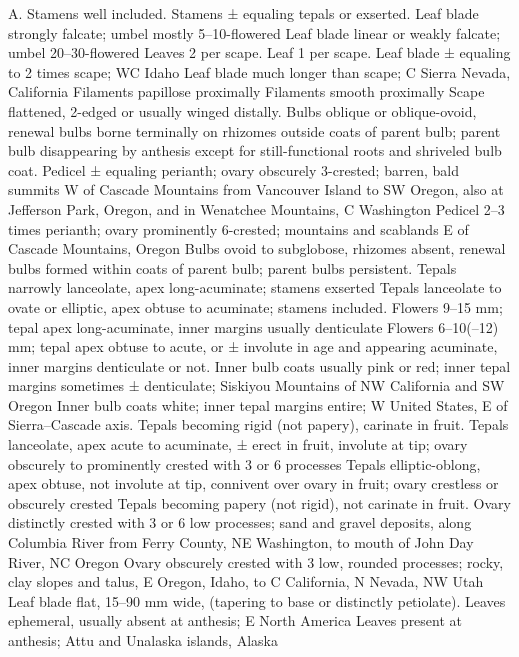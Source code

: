 \documentclass[a4paper]{article}
\begin{document}
\begin{Key}{A. }
\alter Stamens well included.
\alter Stamens ± equaling tepals or exserted.
\alter Leaf blade strongly falcate; umbel mostly 5--10-flowered
\alter Leaf blade linear or weakly falcate; umbel 20--30-flowered
\alter Leaves 2 per scape.
\alter Leaf 1 per scape.
\alter Leaf blade ± equaling to 2 times scape; WC Idaho
\alter Leaf blade much longer than scape; C Sierra Nevada, California
\alter Filaments papillose proximally
\alter Filaments smooth proximally
\alter Scape flattened, 2-edged or usually winged distally.
\alter Bulbs oblique or oblique-ovoid, renewal bulbs borne terminally on rhizomes outside coats of parent bulb; parent bulb disappearing by anthesis except for still-functional roots and shriveled bulb coat.
\alter Pedicel ± equaling perianth; ovary obscurely 3-crested; barren, bald summits W of Cascade Mountains from Vancouver Island to SW Oregon, also at Jefferson Park, Oregon, and in Wenatchee Mountains, C Washington
\alter Pedicel 2--3 times perianth; ovary prominently 6-crested; mountains and scablands E of Cascade Mountains, Oregon
\alter Bulbs ovoid to subglobose, rhizomes absent, renewal bulbs formed within coats of parent bulb; parent bulbs persistent.
\alter Tepals narrowly lanceolate, apex long-acuminate; stamens exserted
\alter Tepals lanceolate to ovate or elliptic, apex obtuse to acuminate; stamens included.
\alter Flowers 9--15 mm; tepal apex long-acuminate, inner margins usually denticulate
\alter Flowers 6--10(--12) mm; tepal apex obtuse to acute, or ± involute in age and appearing acuminate, inner margins denticulate or not.
\alter Inner bulb coats usually pink or red; inner tepal margins sometimes ± denticulate; Siskiyou Mountains of NW California and SW Oregon
\alter Inner bulb coats white; inner tepal margins entire; W United States, E of Sierra--Cascade axis.
\alter Tepals becoming rigid (not papery), carinate in fruit.
\alter Tepals lanceolate, apex acute to acuminate, ± erect in fruit, involute at tip; ovary obscurely to prominently crested with 3 or 6 processes
\alter Tepals elliptic-oblong, apex obtuse, not involute at tip, connivent over ovary in fruit; ovary crestless or obscurely crested
\alter Tepals becoming papery (not rigid), not carinate in fruit.
\alter Ovary distinctly crested with 3 or 6 low processes; sand and gravel deposits, along Columbia River from Ferry County, NE Washington, to mouth of John Day River, NC Oregon
\alter Ovary obscurely crested with 3 low, rounded processes; rocky, clay slopes and talus, E Oregon, Idaho, to C California, N Nevada, NW Utah
\alter Leaf blade flat, 15--90 mm wide, (tapering to base or distinctly petiolate).
\alter Leaves ephemeral, usually absent at anthesis; E North America
\alter Leaves present at anthesis; Attu and Unalaska islands, Alaska
\end{Key}
\end{document}
